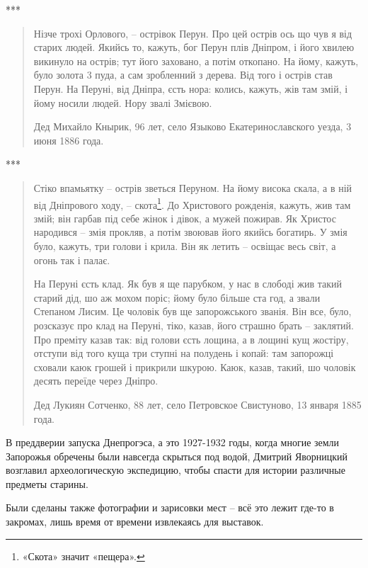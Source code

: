 \begin{center}
***\end{center}

\begin{quotation}
Нізче трохі Орлового, – острівок Перун. Про цей острів ось що чув я від старих людей. Якийсь то, кажуть, бог Перун плів Дніпром, і його хвилею викинуло на острів; тут його заховано, а потім откопано. На йому, кажуть, було золота 3 пуда, а сам зробленний з дерева. Від того і острів став Перун. На Перуні, від Дніпра, єсть нора: колись, кажуть, жів там змій, і йому носили людей. Нору звалі Змієвою.

Дед Михайло Кнырик, 96 лет, село Языково Екатеринославского уезда, 3 июня 1886 года.
\end{quotation}

\begin{center}
***\end{center}

\begin{quotation}
Стіко впамьятку – острів зветься Перуном. На йому висока скала, а в ній від Дніпрового ходу, – скота\footnote{«Скота» значит «пещера».}. До Христового рожденія, кажуть, жив там змій; він гарбав під себе жінок і дівок, а мужей пожирав. Як Христос народився – змія прокляв, а потім звоював його якийсь богатирь. У змія було, кажуть, три голови і крила. Він як летить – освіщає весь світ, а огонь так і палає.

На Перуні єсть клад. Як був я ще парубком, у нас в слободі жив такий старий дід, шо аж мохом поріс; йому було більше ста год, а звали Степаном Лисим. Це чоловік був ще запорожського званія. Він все, було, розсказує про клад на Перуні, тіко, казав, його страшно брать – заклятий. Про преміту казав так: від голови єсть лощина, а в лощині кущ жостіру, отступи від того куща три ступні на полудень і копай: там запорожці сховали каюк грошей і прикрили шкурою. Каюк, казав, такий, шо чоловік десять переїде через Дніпро.

Дед Лукиян Сотченко, 88 лет, село Петровское Свистуново, 13 января 1885 года.
\end{quotation}

В преддверии запуска Днепрогэса, а это 1927-1932 годы, когда многие земли Запорожья обречены были навсегда скрыться под водой, Дмитрий Яворницкий возглавил археологическую экспедицию, чтобы спасти для истории различные предметы старины. 

Были сделаны также фотографии и зарисовки мест – всё это лежит где-то в закромах, лишь время от времени извлекаясь для выставок. 


